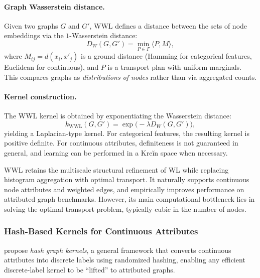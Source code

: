 \paragraph{Graph Wasserstein distance.}
Given two graphs $G$ and $G'$, WWL defines a distance
between the sets of node embeddings via the
$1$-Wasserstein distance:
\[
D_W(G,G')
=
\min_{P \in \Gamma}
\langle P, M \rangle,
\]
where $M_{ij} = d(x_i, x'_j)$ is a ground distance
(Hamming for categorical features, Euclidean for continuous),
and $P$ is a transport plan with uniform marginals.
This compares graphs as \emph{distributions of nodes}
rather than via aggregated counts.

\paragraph{Kernel construction.}
The WWL kernel is obtained by exponentiating the
Wasserstein distance:
\[
k_{\mathrm{WWL}}(G,G')
=
\exp\!\big(-\lambda D_W(G,G')\big),
\]
yielding a Laplacian-type kernel.
For categorical features, the resulting kernel is
positive definite.
For continuous attributes, definiteness is not guaranteed
in general, and learning can be performed in a
Kreĭn space when necessary.

WWL retains the multiscale structural refinement of WL
while replacing histogram aggregation with optimal transport.
It naturally supports continuous node attributes and weighted edges,
and empirically improves performance on attributed graph benchmarks.
However, its main computational bottleneck lies in solving
the optimal transport problem, typically cubic in the number
of nodes.

\subsubsection{Hash-Based Kernels for Continuous Attributes}
\label{sec:theory:hash_kernels}
\citet{morris2016fasterkernelsgraphscontinuous} propose
\emph{hash graph kernels}, a general framework that converts continuous attributes into
discrete labels using randomized hashing, enabling any efficient discrete-label kernel to be
``lifted'' to attributed graphs.


